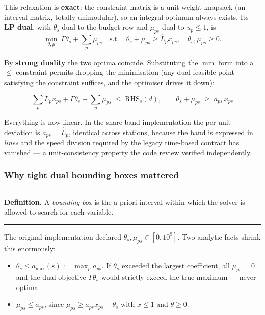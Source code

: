 \documentclass[11pt,a4paper]{article}
\newenvironment{keybox}
  {\par\medskip\noindent\rule{\linewidth}{0.9pt}\par\nobreak\smallskip\ignorespaces}
  {\par\smallskip\nobreak\noindent\rule{\linewidth}{0.9pt}\par\medskip}
\begin{document}
This relaxation is \textbf{exact}: the constraint matrix is a unit-weight
knapsack (an interval matrix, totally unimodular), so an integral optimum
always exists. Its \textbf{LP dual}, with $\theta_s$ dual to the budget row and
$\mu_{ps}$ dual to $u_p\le1$, is
\begin{equation}
  \min_{\theta,\mu} \ \Gamma\theta_s + \sum_p \mu_{ps}
  \quad\text{s.t.}\quad
  \theta_s + \mu_{ps} \ge \hat L_p x_{ps}, \quad \theta_s,\mu_{ps}\ge 0 .
  \label{eq:dual}
\end{equation}

By \textbf{strong duality} the two optima coincide. Substituting the $\min$
form into a $\le$ constraint permits dropping the minimisation (any
dual-feasible point satisfying the constraint suffices, and the optimiser
drives it down):

\begin{equation}
  \boxed{\;
  \sum_p \bar L_p x_{ps} + \Gamma\theta_s + \sum_p \mu_{ps} \;\le\; \mathrm{RHS}_s(d),
  \qquad
  \theta_s + \mu_{ps} \;\ge\; a_{ps}\,x_{ps}
  \;}
  \label{eq:bsfinal}
\end{equation}

Everything is now linear. In the share-band implementation the per-unit
deviation is $a_{ps}=\hat L_p$, identical across stations, because the band is
expressed in \emph{lines} and the speed division required by the legacy
time-based contract has vanished --- a unit-consistency property the code
review verified independently.

\subsubsection*{Why tight dual bounding boxes mattered}

\begin{keybox}
\textbf{Definition.} A \emph{bounding box} is the a-priori interval within
which the solver is allowed to search for each variable.
\end{keybox}

The original implementation declared $\theta_s,\mu_{ps}\in[0,10^9]$. Two
analytic facts shrink this enormously:

\begin{itemize}
  \item $\theta_s \le a_{\max}(s) := \max_p a_{ps}$. If $\theta_s$ exceeded the
        largest coefficient, all $\mu_{ps}=0$ and the dual objective
        $\Gamma\theta_s$ would strictly exceed the true maximum --- never optimal.
  \item $\mu_{ps} \le a_{ps}$, since $\mu_{ps}\ge a_{ps}x_{ps}-\theta_s$ with
        $x\le1$ and $\theta\ge0$.
\end{itemize}
\end{document}
